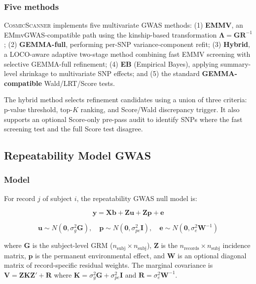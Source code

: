 \documentclass[11pt,a4paper]{article}
\newcommand{\CosmicScanner}{\textsc{CosmicScanner}}
\begin{document}
\subsubsection{Five methods}

\CosmicScanner{} implements five multivariate GWAS methods: (1) \textbf{EMMV}, an EMmvGWAS-compatible path using the kinship-based transformation $\boldsymbol{\Lambda} = \mathbf{G}\mathbf{R}^{-1}$; (2) \textbf{GEMMA-full}, performing per-SNP variance-component refit; (3) \textbf{Hybrid}, a LOCO-aware adaptive two-stage method combining fast EMMV screening with selective GEMMA-full refinement; (4) \textbf{EB} (Empirical Bayes), applying summary-level shrinkage to multivariate SNP effects; and (5) the standard \textbf{GEMMA-compatible} Wald/LRT/Score tests.

The hybrid method selects refinement candidates using a union of three criteria: p-value threshold, top-$K$ ranking, and Score/Wald discrepancy trigger. It also supports an optional Score-only pre-pass audit to identify SNPs where the fast screening test and the full Score test disagree.

\subsection{Repeatability Model GWAS}
\label{sec:repeatability}

\subsubsection{Model}

For record $j$ of subject $i$, the repeatability GWAS null model is:

\begin{equation}
\mathbf{y} = \mathbf{X}\mathbf{b} + \mathbf{Z}\mathbf{u} + \mathbf{Z}\mathbf{p} + \mathbf{e}
\label{eq:repeat}
\end{equation}

\begin{equation}
\mathbf{u} \sim N(\mathbf{0}, \sigma_g^2 \mathbf{G}), \quad \mathbf{p} \sim N(\mathbf{0}, \sigma_{pe}^2 \mathbf{I}), \quad \mathbf{e} \sim N(\mathbf{0}, \sigma_e^2 \mathbf{W}^{-1})
\label{eq:repeat_var}
\end{equation}

where $\mathbf{G}$ is the subject-level GRM ($n_{\text{subj}} \times n_{\text{subj}}$), $\mathbf{Z}$ is the $n_{\text{records}} \times n_{\text{subj}}$ incidence matrix, $\mathbf{p}$ is the permanent environmental effect, and $\mathbf{W}$ is an optional diagonal matrix of record-specific residual weights. The marginal covariance is $\mathbf{V} = \mathbf{Z}\mathbf{K}\mathbf{Z}' + \mathbf{R}$ where $\mathbf{K} = \sigma_g^2 \mathbf{G} + \sigma_{pe}^2 \mathbf{I}$ and $\mathbf{R} = \sigma_e^2 \mathbf{W}^{-1}$.
\end{document}
